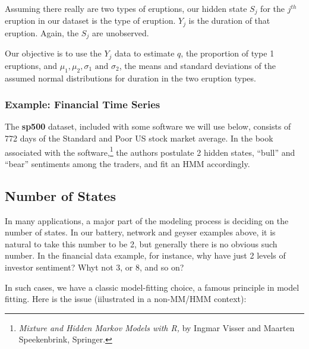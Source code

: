 \documentclass[11pt]{article}
\begin{document}
Assuming there really are two types of eruptions, our hidden state $S_j$
for the $j^{th}$ eruption in our dataset is the type of eruption.  $Y_j$
is the duration of that eruption.  Again, the $S_j$ are unobserved.

Our objective is to use the $Y_j$ data to estimate $q$, the proportion
of type 1 eruptions, and
$
\mu_1,
\mu_2,
\sigma_1 
\textrm{ and }
\sigma_2 
$, the means and standard deviations of the assumed normal distributions
for duration in the two eruption types.

\subsubsection{Example:  Financial Time Series}
\label{fintech}

The \textbf{sp500} dataset, included with some software we will use
below, consists of 772 days of the Standard and Poor US stock market
average.  In the book associated with the
software,\footnote{\textit{Mixture and Hidden Markov Models with R,} by
Ingmar Visser and Maarten Speekenbrink, Springer.} the authors postulate
2 hidden states, ``bull'' and ``bear'' sentiments among the traders, and
fit an HMM accordingly.  

\subsection{Number of States}

In many applications, a major part of the modeling process is deciding
on the number of states.  In our battery, network and geyser examples
above, it is natural to take this number to be 2, but generally there is
no obvious such number.  In the financial data example, for instance,
why have just 2 levels of investor sentiment?  Whyt not 3, or 8, and so
on?

In
such cases, we have a classic model-fitting choice, a famous principle
in model fitting.  Here is the issue (iilustrated in a non-MM/HMM
context):
\end{document}
